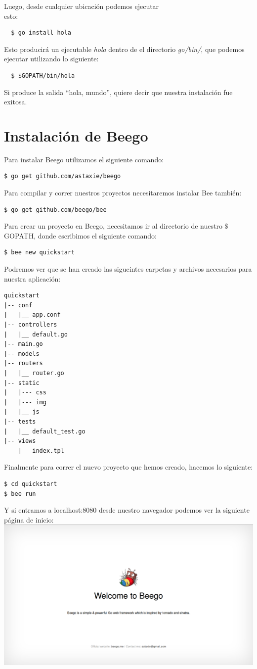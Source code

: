 \documentclass[12pt]{article}
\begin{document}
Luego, desde cualquier ubicación podemos ejecutar\\
esto:
\begin{verbatim}
  $ go install hola
\end{verbatim}

Esto producirá un ejecutable \textit{hola} dentro de el directorio \textit{go/bin/},
que podemos ejecutar utilizando lo siguiente:
\begin{verbatim}
  $ $GOPATH/bin/hola
\end{verbatim}

Si produce la salida ``hola, mundo'', quiere decir que nuestra instalación fue exitosa.

\section*{Instalación de Beego}

\noindent Para instalar Beego utilizamos el siguiente comando:
\begin{verbatim}
$ go get github.com/astaxie/beego
\end{verbatim}

\noindent Para compilar y correr nuestros proyectos necesitaremos instalar Bee también:
\begin{verbatim}
$ go get github.com/beego/bee
\end{verbatim}

\noindent Para crear un proyecto en Beego, necesitamos ir al directorio de nuestro $\$$GOPATH, donde escribimos el siguiente comando:
\begin{verbatim}
$ bee new quickstart
\end{verbatim}
\noindent Podremos ver que se han creado las sigueintes carpetas y archivos necesarios para nuestra aplicación:

\begin{verbatim}
quickstart
|-- conf
|   |__ app.conf
|-- controllers
|   |__ default.go
|-- main.go
|-- models
|-- routers
|   |__ router.go
|-- static
|   |--- css
|   |--- img
|   |__ js
|-- tests
|   |__ default_test.go
|-- views
    |__ index.tpl
\end{verbatim}

\noindent Finalmente para correr el nuevo proyecto que hemos creado,  hacemos lo siguiente:
\begin{verbatim}
$ cd quickstart
$ bee run
\end{verbatim}
\noindent Y si entramos a localhost:8080 desde nuestro navegador podemos ver la siguiente página de inicio: \\

\includegraphics[scale=0.25]{beego.png}
\end{document}
